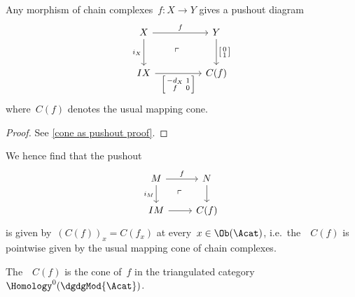 \documentclass[a4paper,10pt]{scrartcl}
\begin{document}
\begin{lemma}
  \label{cone as pushout}
  Any morphism of chain complexes~$f \colon X \to Y$ gives a pushout diagram
  \[
    \begin{tikzcd}[ampersand replacement = \&, row sep = large, column sep = huge]
      X
      \arrow{r}[above]{f}
      \arrow{d}[left]{i_X}
      \arrow[phantom]{dr}{\ulcorner}
      \&
      Y
      \arrow{d}[right]{\begin{bsmallmatrix} 0 \\ 1 \end{bsmallmatrix}}
      \\
      IX
      \arrow{r}[below]{\begin{bsmallmatrix} -d_X & 1 \\ f & 0 \end{bsmallmatrix}}
      \&
      C(f)
    \end{tikzcd}
  \]
  where~$C(f)$ denotes the usual mapping cone.
\end{lemma}

\begin{proof}
  See \cref{cone as pushout proof}.
\end{proof}

We hence find that the pushout
\[
  \begin{tikzcd}
    M
    \arrow{r}[above]{f}
    \arrow{d}[left]{i_M}
      \arrow[phantom]{dr}{\ulcorner}
    &
    N
    \arrow{d}
    \\
    IM
    \arrow{r}
    &
    C(f)
  \end{tikzcd}
\]
is given by~$(C(f))_x = C(f_x)$ at every~$x \in \Ob(\Acat)$, i.e.\ the~{\dgmodule{$\Acat$}}~$C(f)$ is pointwise given by the usual mapping cone of chain complexes.

\begin{proposition}
  The~{\dgmodule{$\Acat$}}~$C(f)$ is the cone of~$f$ in the triangulated category~$\Homology^0(\dgdgMod{\Acat})$.
\end{proposition}
\end{document}
